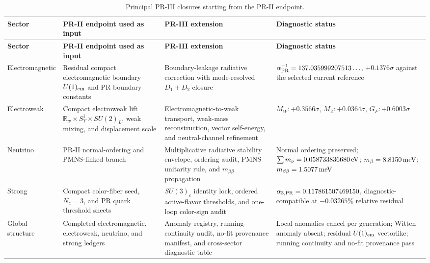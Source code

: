 \documentclass[11pt]{article}
\begin{document}
{\small
\begin{longtable}{
  >{\raggedright\arraybackslash}p{}
  >{\raggedright\arraybackslash}p{}
  >{\raggedright\arraybackslash}p{}
  >{\raggedright\arraybackslash}p{}
}
\caption{Principal PR-III closures starting from the PR-II endpoint.}
\label{tab:priii-principal-closures}\\
\toprule
\textbf{Sector} & \textbf{PR-II endpoint used as input} & \textbf{PR-III extension} & \textbf{Diagnostic status} \\
\midrule
\endfirsthead
\toprule
\textbf{Sector} & \textbf{PR-II endpoint used as input} & \textbf{PR-III extension} & \textbf{Diagnostic status} \\
\midrule
\endhead

Electromagnetic
& Residual compact electromagnetic boundary \(U(1)_{\rm em}\) and PR boundary constants
& Boundary-leakage radiative correction with mode-resolved \(D_1+D_2\) closure
& \(\alpha_{\rm PR}^{-1}=137.035999207513\ldots\), \(+0.1376\sigma\) against the selected current reference \\
\addlinespace

Electroweak
& Compact electroweak lift \(\mathbb R_w\times S_Y^1\times SU(2)_L\), weak mixing, and displacement scale
& Electromagnetic-to-weak transport, weak-mass reconstruction, vector self-energy, and neutral-channel refinement
& \(M_W:+0.3566\sigma\), \(M_Z:+0.0364\sigma\), \(G_F:+0.6003\sigma\) \\
\addlinespace

Neutrino
& PR-II normal-ordering and PMNS-linked branch
& Multiplicative radiative stability envelope, ordering audit, PMNS unitarity rule, and \(m_{\beta\beta}\) propagation
& Normal ordering preserved; \(\sum m_\nu=0.058733836680\,{\rm eV}\); \(m_\beta=8.8150\,{\rm meV}\); \(m_{\beta\beta}=1.5077\,{\rm meV}\) \\
\addlinespace

Strong
& Compact color-fiber seed, \(N_c=3\), and PR quark threshold sheets
& \(SU(3)_c\) identity lock, ordered active-flavor thresholds, and one-loop color-sign audit
& \(\alpha_{3,{\rm PR}}=0.117861507469150\), diagnostic-compatible at \(-0.03265\%\) relative residual \\
\addlinespace

Global structure
& Completed electromagnetic, electroweak, neutrino, and strong ledgers
& Anomaly registry, running-continuity audit, no-fit provenance manifest, and cross-sector diagnostic table
& Local anomalies cancel per generation; Witten anomaly absent; residual \(U(1)_{\rm em}\) vectorlike; running continuity and no-fit provenance pass \\

\bottomrule
\end{longtable}
}
\end{document}
